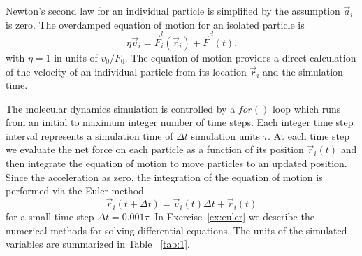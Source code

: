 \documentclass[twocolumn,preprintnumbers,amsmath,amssymb,aps,prx]{revtex4}
\begin{document}
Newton's second law for an individual particle
is simplified
by the assumption $\vec{a}_i$ is zero. %
The overdamped equation of motion for an isolated particle is
\begin{equation}
  \eta \vec{v}_i = \vec{F}^l_{i}(\vec{r}_i) + \vec{F}^{d}(t).
    \label{eq:motion}
\end{equation}
with  $\eta = 1$ in units of $v_0 / F_0$. 
The equation of motion provides a direct calculation of the velocity
of an individual particle from its location $\vec{r}_i$ %
and the simulation time.

The molecular dynamics simulation is controlled by a $for()$ loop
which runs from an initial to maximum integer number of time steps.
Each integer time step interval %
represents a simulation time of $\Delta t$ 
simulation units $\tau$.  %
At each time step
we evaluate the net force on each particle as a function of its position
$\vec{r}_i(t)$
and then integrate
the equation of motion to move particles
to an updated position.
Since the acceleration as zero,
the integration of the equation of motion
is performed via 
the Euler method 
\begin{equation}
  \vec{r}_i(t+\Delta t) = \vec{v}_i(t) \Delta t + \vec{r}_i(t)
    \label{eq:euler}
\end{equation}
for a small time step $\Delta t = 0.001 \tau$.
In %
Exercise~\ref{ex:euler}
we describe 
the numerical methods for 
solving differential equations.
%
The units of the simulated variables are summarized in Table ~\ref{tab:1}.
\end{document}
